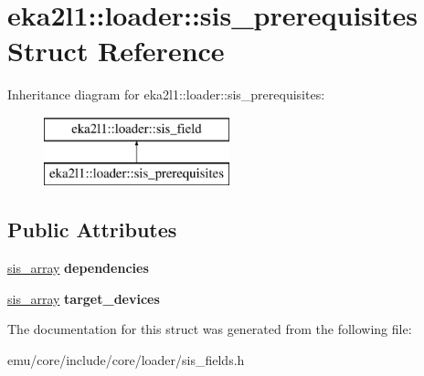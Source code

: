 \hypertarget{structeka2l1_1_1loader_1_1sis__prerequisites}{}\section{eka2l1\+:\+:loader\+:\+:sis\+\_\+prerequisites Struct Reference}
\label{structeka2l1_1_1loader_1_1sis__prerequisites}
Inheritance diagram for eka2l1\+:\+:loader\+:\+:sis\+\_\+prerequisites\+:\begin{figure}[H]
\begin{center}
\leavevmode
\includegraphics[height=2.000000cm]{structeka2l1_1_1loader_1_1sis__prerequisites}
\end{center}
\end{figure}
\subsection*{Public Attributes}
\begin{DoxyCompactItemize}
\item 
\mbox{\label{structeka2l1_1_1loader_1_1sis__prerequisites_a2109792fde0df10ce7475f55421c9835}} 
\mbox{\hyperlink{structeka2l1_1_1loader_1_1sis__array}{sis\+\_\+array}} {\bfseries dependencies}
\item 
\mbox{\label{structeka2l1_1_1loader_1_1sis__prerequisites_aac6fb35d7643de47f571f9d241fd3712}} 
\mbox{\hyperlink{structeka2l1_1_1loader_1_1sis__array}{sis\+\_\+array}} {\bfseries target\+\_\+devices}
\end{DoxyCompactItemize}


The documentation for this struct was generated from the following file\+:\begin{DoxyCompactItemize}
\item 
emu/core/include/core/loader/sis\+\_\+fields.\+h\end{DoxyCompactItemize}
